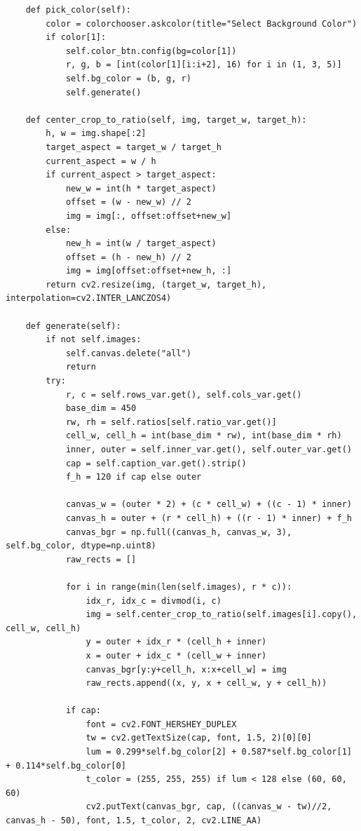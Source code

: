 \documentclass[a4paper]{article}
\begin{document}
\begin{verbatim}
    def pick_color(self):
        color = colorchooser.askcolor(title="Select Background Color")
        if color[1]: 
            self.color_btn.config(bg=color[1])
            r, g, b = [int(color[1][i:i+2], 16) for i in (1, 3, 5)]
            self.bg_color = (b, g, r) 
            self.generate()

    def center_crop_to_ratio(self, img, target_w, target_h):
        h, w = img.shape[:2]
        target_aspect = target_w / target_h
        current_aspect = w / h
        if current_aspect > target_aspect:
            new_w = int(h * target_aspect)
            offset = (w - new_w) // 2
            img = img[:, offset:offset+new_w]
        else:
            new_h = int(w / target_aspect)
            offset = (h - new_h) // 2
            img = img[offset:offset+new_h, :]
        return cv2.resize(img, (target_w, target_h), interpolation=cv2.INTER_LANCZOS4)

    def generate(self):
        if not self.images: 
            self.canvas.delete("all")
            return
        try:
            r, c = self.rows_var.get(), self.cols_var.get()
            base_dim = 450
            rw, rh = self.ratios[self.ratio_var.get()]
            cell_w, cell_h = int(base_dim * rw), int(base_dim * rh)
            inner, outer = self.inner_var.get(), self.outer_var.get()
            cap = self.caption_var.get().strip()
            f_h = 120 if cap else outer
            
            canvas_w = (outer * 2) + (c * cell_w) + ((c - 1) * inner)
            canvas_h = outer + (r * cell_h) + ((r - 1) * inner) + f_h
            canvas_bgr = np.full((canvas_h, canvas_w, 3), self.bg_color, dtype=np.uint8)
            raw_rects = []

            for i in range(min(len(self.images), r * c)):
                idx_r, idx_c = divmod(i, c)
                img = self.center_crop_to_ratio(self.images[i].copy(), cell_w, cell_h)
                y = outer + idx_r * (cell_h + inner)
                x = outer + idx_c * (cell_w + inner)
                canvas_bgr[y:y+cell_h, x:x+cell_w] = img
                raw_rects.append((x, y, x + cell_w, y + cell_h))

            if cap:
                font = cv2.FONT_HERSHEY_DUPLEX
                tw = cv2.getTextSize(cap, font, 1.5, 2)[0][0]
                lum = 0.299*self.bg_color[2] + 0.587*self.bg_color[1] + 0.114*self.bg_color[0]
                t_color = (255, 255, 255) if lum < 128 else (60, 60, 60)
                cv2.putText(canvas_bgr, cap, ((canvas_w - tw)//2, canvas_h - 50), font, 1.5, t_color, 2, cv2.LINE_AA)


\end{verbatim}
\end{document}

